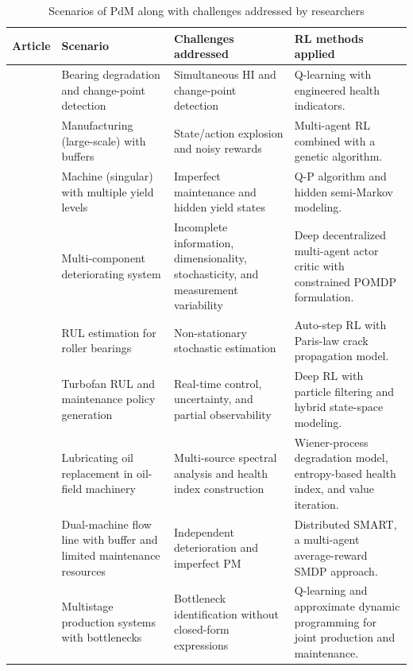 \documentclass[12pt,oneside]{book}
\renewcommand{\arraystretch}{1.5}
\begin{document}
\begin{landscape}
	\begin{table}[h]
		\renewcommand{\arraystretch}{1.3}
		\begin{minipage}{\textwidth}
			\caption{Scenarios of PdM along with challenges addressed by researchers}\label{tbl:AgoDetails}
			\begin{tabular}{@{}L{3.5cm}L{5.5cm}L{5.5cm}L{8cm}@{}}
				\toprule
				\textbf{Article} & \textbf{Scenario} & \textbf{Challenges addressed} & \textbf{RL methods applied}\\
				\midrule
				\cite{Cheng2018} & Bearing degradation and change-point detection & Simultaneous HI and change-point detection & Q-learning with engineered health indicators.\\
				\cite{Li2020GA} & Manufacturing (large-scale) with buffers & State/action explosion and noisy rewards & Multi-agent RL combined with a genetic algorithm.\\
				\cite{Wang20149} & Machine (singular) with multiple yield levels & Imperfect maintenance and hidden yield states & Q-P algorithm and hidden semi-Markov modeling.\\
				\cite{Andriotis2021} & Multi-component deteriorating system & Incomplete information, dimensionality, stochasticity, and measurement variability & Deep decentralized multi-agent actor critic with constrained POMDP formulation.\\
				\cite{Afshari2014} & RUL estimation for roller bearings & Non-stationary stochastic estimation & Auto-step RL with Paris-law crack propagation model.\\
				\cite{Skordilis2020} & Turbofan RUL and maintenance policy generation & Real-time control, uncertainty, and partial observability & Deep RL with particle filtering and hybrid state-space modeling.\\
				\cite{Yan201992110} & Lubricating oil replacement in oil-field machinery & Multi-source spectral analysis and health index construction & Wiener-process degradation model, entropy-based health index, and value iteration.\\
				\cite{Ling2018364} & Dual-machine flow line with buffer and limited maintenance resources & Independent deterioration and imperfect PM & Distributed SMART, a multi-agent average-reward SMDP approach.\\
				\cite{Feng202218910} & Multistage production systems with bottlenecks & Bottleneck identification without closed-form expressions & Q-learning and approximate dynamic programming for joint production and maintenance.\\
				\bottomrule
			\end{tabular}
		\end{minipage}
	\end{table}
\end{landscape}
\restoregeometry
\end{document}
